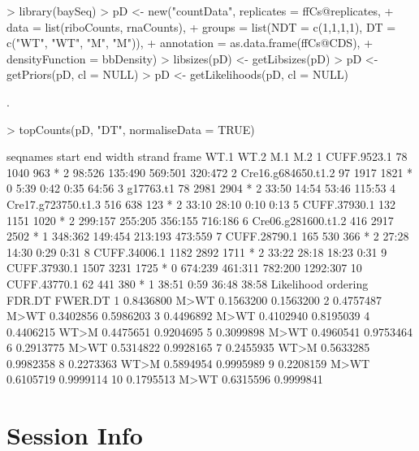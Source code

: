 \documentclass[a4paper]{article}
\begin{document}
\begin{Schunk}
\begin{Sinput}
> library(baySeq)
> pD <- new("countData", replicates = ffCs@replicates, 
+           data = list(riboCounts, rnaCounts),
+           groups = list(NDT = c(1,1,1,1), DT = c("WT", "WT", "M", "M")),
+           annotation = as.data.frame(ffCs@CDS),
+           densityFunction = bbDensity)
> libsizes(pD) <- getLibsizes(pD)
> pD <- getPriors(pD, cl = NULL)
> pD <- getLikelihoods(pD, cl = NULL)
\end{Sinput}
\begin{Soutput}
.
\end{Soutput}
\begin{Sinput}
> topCounts(pD, "DT", normaliseData = TRUE)
\end{Sinput}
\begin{Soutput}
             seqnames start  end width strand frame    WT.1    WT.2     M.1      M.2
1         CUFF.9523.1    78 1040   963      *     2  98:526 135:490 569:501  320:472
2  Cre16.g684650.t1.2    97 1917  1821      *     0    5:39    0:42    0:35    64:56
3           g17763.t1    78 2981  2904      *     2   33:50   14:54   53:46   115:53
4  Cre17.g723750.t1.3   516  638   123      *     2   33:10   28:10    0:10     0:13
5        CUFF.37930.1   132 1151  1020      *     2 299:157 255:205 356:155  716:186
6  Cre06.g281600.t1.2   416 2917  2502      *     1 348:362 149:454 213:193  473:559
7        CUFF.28790.1   165  530   366      *     2   27:28   14:30    0:29     0:31
8        CUFF.34006.1  1182 2892  1711      *     2   33:22   28:18   18:23     0:31
9        CUFF.37930.1  1507 3231  1725      *     0 674:239 461:311 782:200 1292:307
10       CUFF.43770.1    62  441   380      *     1   38:51    0:59   36:48    38:58
   Likelihood ordering    FDR.DT   FWER.DT
1   0.8436800     M>WT 0.1563200 0.1563200
2   0.4757487     M>WT 0.3402856 0.5986203
3   0.4496892     M>WT 0.4102940 0.8195039
4   0.4406215     WT>M 0.4475651 0.9204695
5   0.3099898     M>WT 0.4960541 0.9753464
6   0.2913775     M>WT 0.5314822 0.9928165
7   0.2455935     WT>M 0.5633285 0.9982358
8   0.2273363     WT>M 0.5894954 0.9995989
9   0.2208159     M>WT 0.6105719 0.9999114
10  0.1795513     M>WT 0.6315596 0.9999841
\end{Soutput}
\end{Schunk}

\section*{Session Info}
\end{document}
